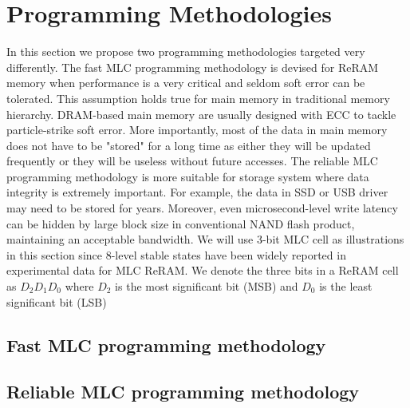 \section{Programming Methodologies} \label{sec:programming}

In this section we propose two programming methodologies targeted very differently. The fast MLC programming methodology is devised for ReRAM memory when performance is a very critical and seldom soft error can be tolerated. This assumption holds true for main memory in traditional memory hierarchy. DRAM-based main memory are usually designed with ECC to tackle particle-strike soft error. More importantly, most of the data in main memory does not have to be "stored" for a long time as either they will be updated frequently or they will be useless without future accesses. The reliable MLC programming methodology is more suitable for storage system where data integrity is extremely important. For example, the data in SSD or USB driver may need to be stored for years. Moreover, even microsecond-level write latency can be hidden by large block size in conventional NAND flash product, maintaining an acceptable bandwidth. We will use 3-bit MLC cell as illustrations in this section since 8-level stable states have been widely reported in experimental data for MLC ReRAM. We denote the three bits in a ReRAM cell as $D_2D_1D_0$ where $D_2$ is the most significant bit (MSB) and $D_0$ is the least significant bit (LSB)

\subsection{Fast MLC programming methodology}

\subsection{Reliable MLC programming methodology}



